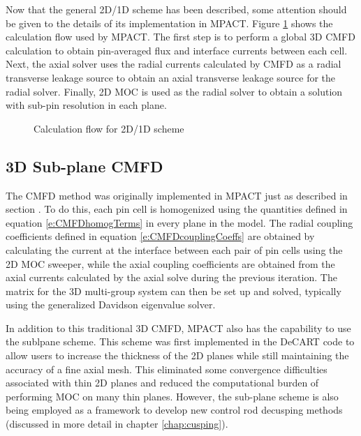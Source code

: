 Now that the general 2D/1D scheme has been described, some attention should be given to the details of its implementation in MPACT.  Figure \ref{f:2d1d-flowchart} shows the calculation flow used by MPACT.  The first step is to perform a global 3D CMFD calculation to obtain pin-averaged flux and interface currents between each cell.  Next, the axial solver uses the radial currents calculated by CMFD as a radial transverse leakage source to obtain an axial transverse leakage source for the radial solver.  Finally, 2D MOC is used as the radial solver to obtain a solution with sub-pin resolution in each plane.

\begin{figure}
\centering

\caption{Calculation flow for 2D/1D scheme}\label{f:2d1d-flowchart}
\end{figure}

\subsection{3D Sub-plane CMFD}

The CMFD method was originally implemented in MPACT just as described in section .  To do this, each pin cell is homogenized using the quantities defined in equation \ref{e:CMFDhomogTerms} in every plane in the model.  The radial coupling coefficients defined in equation \ref{e:CMFDcouplingCoeffs} are obtained by calculating the current at the interface between each pair of pin cells using the 2D MOC sweeper, while the axial coupling coefficients are obtained from the axial currents calculated by the axial solve during the previous iteration.  The matrix for the 3D multi-group system can then be set up and solved, typically using the generalized Davidson eigenvalue solver.

In addition to this traditional 3D CMFD, MPACT also has the capability to use the sublpane scheme.  This scheme was first implemented in the DeCART code to allow users to increase the thickness of the 2D planes while still maintaining the accuracy of a fine axial mesh.  This eliminated some convergence difficulties associated with thin 2D planes  and reduced the computational burden of performing MOC on many thin planes.  However, the sub-plane scheme is also being employed as a framework to develop new control rod decusping methods (discussed in more detail in chapter \ref{chap:cusping}).


